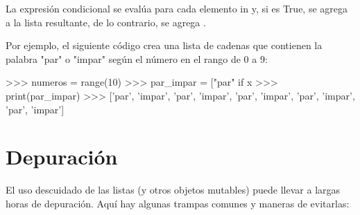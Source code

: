 La expresión condicional  se evalúa para cada elemento in  y, si es True, se agrega  a la lista resultante, de lo contrario, se agrega .

Por ejemplo, el siguiente código crea una lista de cadenas que contienen la palabra "par" o "impar" según el número en el rango de 0 a 9:

\begin{python}
>>> numeros = range(10)
>>> par_impar = ["par" if x %
>>> print(par_impar)
>>> ['par', 'impar', 'par', 'impar', 'par', 'impar', 'par', 'impar', 'par', 'impar']
\end{python}

\section{Depuración}

El uso descuidado de las listas (y otros objetos mutables)
puede llevar a largas horas de depuración.  Aquí hay algunas
trampas comunes y maneras de evitarlas:

